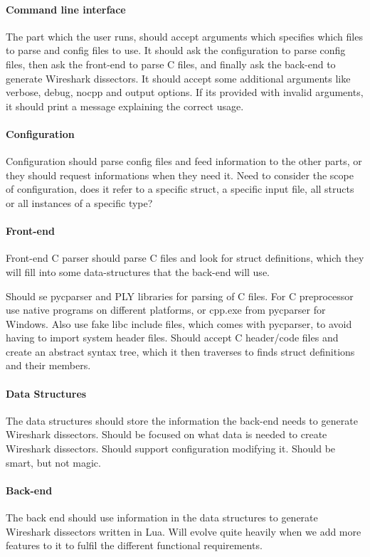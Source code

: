 \paragraph{Command line interface}
The part which the user runs, should accept arguments which specifies which
files to parse and config files to use. It should ask the configuration to
parse config files, then ask the front-end to parse C files, and finally ask
the back-end to generate Wireshark dissectors. It should accept some additional
arguments like verbose, debug, nocpp and output options. If its provided with
invalid arguments, it should print a message explaining the correct usage.

\paragraph{Configuration}
Configuration should parse config files and feed information to the other
parts, or they should request informations when they need it. Need to consider
the scope of configuration, does it refer to a specific struct, a specific
input file, all structs or all instances of a specific type?

\paragraph{Front-end}
Front-end C parser should parse C files and look for struct definitions,
which they will fill into some data-structures that the back-end will use.

Should se pycparser and PLY libraries for parsing of C files. For C
preprocessor use native programs on different platforms, or cpp.exe from
pycparser for Windows. Also use fake libc include files, which comes with
pycparser, to avoid having to import system header files. Should accept C
header/code files and create an abstract syntax tree, which it then traverses
to finds struct definitions and their members.

\paragraph{Data Structures}
The data structures should store the information the back-end needs to generate
Wireshark dissectors. Should be focused on what data is needed to create
Wireshark dissectors. Should support configuration modifying it. Should be
smart, but not magic.

\paragraph{Back-end}
The back end should use information in the data structures to generate
Wireshark dissectors written in Lua. Will evolve quite heavily when we add
more features to it to fulfil the different functional requirements.

